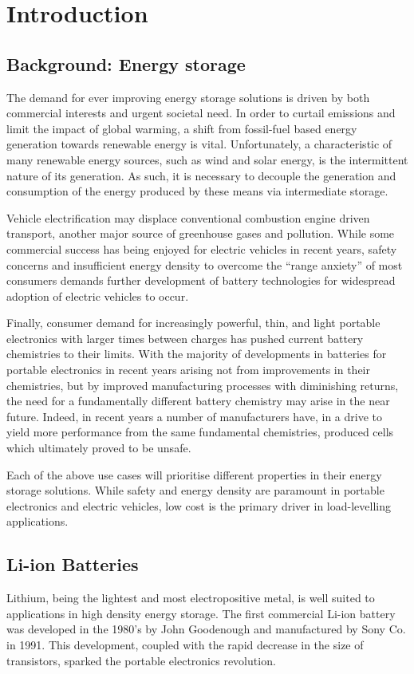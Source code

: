 \chapter{Introduction}
\section{Background: Energy storage}
The demand for ever improving energy storage solutions is driven by both commercial interests and urgent societal need.
In order to curtail  emissions and limit the impact of global warming, a shift from fossil-fuel based energy generation towards renewable energy is vital.\cite{Goodenough2013}
Unfortunately, a characteristic of many renewable energy sources, such as wind and solar energy, is the intermittent nature of its generation.\cite{Goodenough2010a}
As such, it is necessary to decouple the generation and consumption of the energy produced by these means via intermediate storage.

Vehicle electrification may displace conventional combustion engine driven transport, another major source of greenhouse gases and pollution.
While some commercial success has being enjoyed for electric vehicles in recent years, safety concerns and insufficient energy density to overcome the ``range anxiety'' of most consumers demands further development of battery technologies for widespread adoption of electric vehicles to occur.

Finally, consumer demand for increasingly powerful, thin, and light portable electronics with larger times between charges has pushed current battery chemistries to their limits.
With the majority of developments in batteries for portable electronics in recent years arising not from improvements in their chemistries, but by improved manufacturing processes with diminishing returns, the need for a fundamentally different battery chemistry may arise in the near future.
Indeed, in recent years a number of manufacturers have, in a drive to yield more performance from the same fundamental chemistries, produced cells which ultimately proved to be unsafe.\cite{Loveridge2018}

Each of the above use cases will prioritise different properties in their energy storage solutions. 
While safety and energy density are paramount in portable electronics and electric vehicles, low cost is the primary driver in load-levelling applications.


\newpage
\section{Li-ion Batteries}
\renewcommand{\thefootnote}{\fnsymbol{footnote}}
Lithium, being the lightest and most electropositive metal, is well suited to applications in high density energy storage.
The first commercial Li-ion battery was developed in the 1980's by John Goodenough\cite{Mizushima1981} and manufactured by Sony Co. in 1991.\cite{Li2018}
This development, coupled with the rapid decrease in the size of transistors, sparked the portable electronics revolution.

